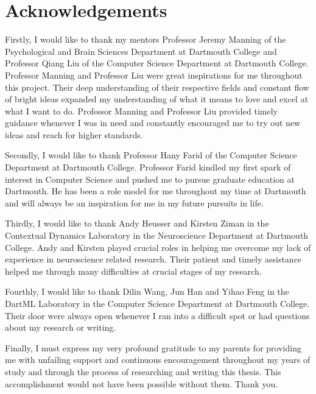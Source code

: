 \documentclass[11pt]{article}
\begin{document}
\section{Acknowledgements}
Firstly, I would like to thank my mentors Professor Jeremy Manning of the Psychological and Brain Sciences Department at Dartmouth College and Professor Qiang Liu of the Computer Science Department at Dartmouth College. Professor Manning and Professor Liu were great inspirations for me throughout this project. Their deep understanding of their respective fields and constant flow of bright ideas expanded my understanding of what it means to love and excel at what I want to do. Professor Manning and Professor Liu provided timely guidance whenever I was in need and constantly encouraged me to try out new ideas and reach for higher standards.

Secondly, I would like to thank Professor Hany Farid of the Computer Science Department at Dartmouth College. Professor Farid kindled my first spark of interest in Computer Science and pushed me to pursue graduate education at Dartmouth. He has been a role model for me throughout my time at Dartmouth and will always be an inspiration for me in my future pursuits in life.

Thirdly, I would like to thank Andy Heusser and Kirsten Ziman in the Contextual Dynamics Laboratory in the Neuroscience Department at Dartmouth College. Andy and Kirsten played crucial roles in helping me overcome my lack of experience in neuroscience related research. Their patient and timely assistance helped me through many difficulties at crucial stages of my research.

Fourthly, I would like to thank Dilin Wang, Jun Han and Yihao Feng in the DartML Laboratory in the Computer Science Department at Dartmouth College. Their door were always open whenever I ran into a difficult spot or had questions about my research or writing.

Finally, I must express my very profound gratitude to my parents for providing me with unfailing support and continuous encouragement throughout my years of study and through the process of researching and writing this thesis. This accomplishment would not have been possible without them. Thank you.

\newpage
\tableofcontents
\newpage
\listoffigures
\newpage
{}
\end{document}
